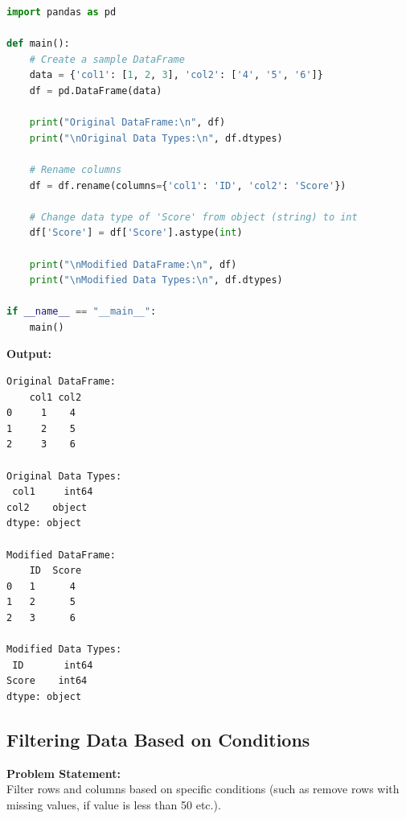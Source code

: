 \documentclass[a4paper,12pt]{article}
\begin{document}
\begin{lstlisting}[language=Python, caption={Rename Columns and Modify Data Types}]
import pandas as pd

def main():
    # Create a sample DataFrame
    data = {'col1': [1, 2, 3], 'col2': ['4', '5', '6']}
    df = pd.DataFrame(data)

    print("Original DataFrame:\n", df)
    print("\nOriginal Data Types:\n", df.dtypes)

    # Rename columns
    df = df.rename(columns={'col1': 'ID', 'col2': 'Score'})

    # Change data type of 'Score' from object (string) to int
    df['Score'] = df['Score'].astype(int)

    print("\nModified DataFrame:\n", df)
    print("\nModified Data Types:\n", df.dtypes)

if __name__ == "__main__":
    main()
\end{lstlisting}
\vspace{0.5cm}
\textbf{Output:}
\begin{lstlisting}[language=bash]
Original DataFrame:
    col1 col2
0     1    4
1     2    5
2     3    6

Original Data Types:
 col1     int64
col2    object
dtype: object

Modified DataFrame:
    ID  Score
0   1      4
1   2      5
2   3      6

Modified Data Types:
 ID       int64
Score    int64
dtype: object
\end{lstlisting}


\subsection{Filtering Data Based on Conditions}
\textbf{Problem Statement:} \\
Filter rows and columns based on specific conditions (such as remove rows with missing values, if value is less than 50 etc.).
\end{document}
